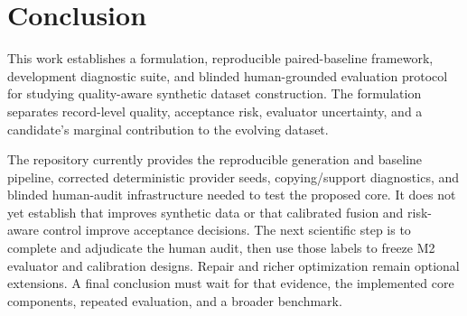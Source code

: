 \section{Conclusion}
\label{sec:conclusion}

This work establishes a formulation, reproducible paired-baseline framework,
development diagnostic suite, and blinded human-grounded evaluation protocol
for studying quality-aware synthetic dataset construction. The formulation
separates record-level quality, acceptance risk, evaluator uncertainty, and a
candidate's marginal contribution to the evolving dataset.

The repository currently provides the reproducible generation and baseline
pipeline, corrected deterministic provider seeds, copying/support diagnostics,
and blinded human-audit infrastructure needed to test the proposed core. It
does not yet establish that \rcqasyn{} improves synthetic data or that
calibrated fusion and risk-aware control improve acceptance decisions. The
next scientific step is to complete and adjudicate the human audit, then use
those labels to freeze M2 evaluator and calibration designs. Repair and richer
optimization remain optional extensions. A final conclusion must wait for
that evidence, the implemented core components, repeated evaluation, and a
broader benchmark.
